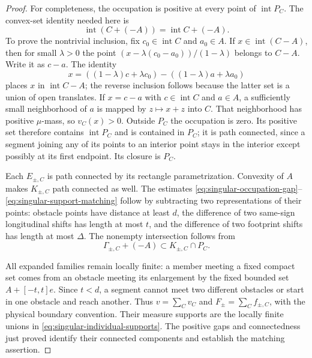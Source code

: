 \begin{proof}
For completeness, the occupation is positive at every point of
$\operatorname{int}P_C$.  The convex-set identity needed here is
\begin{equation}\label{eq:singular-interior-sum}
             \operatorname{int}(C+(-A))
                         =\operatorname{int}C+(-A).
\end{equation}
To prove the nontrivial inclusion, fix $c_0\in\operatorname{int}C$
and $a_0\in A$.  If $x\in\operatorname{int}(C-A)$, then for
small $\lambda>0$ the point
$(x-\lambda(c_0-a_0))/(1-\lambda)$ belongs to $C-A$.
Write it as $c-a$.  The identity
\[
 x=((1-\lambda)c+\lambda c_0)
                  -((1-\lambda)a+\lambda a_0)
\]
places $x$ in $\operatorname{int}C-A$; the reverse inclusion
follows because the latter set is a union of open translates.
If $x=c-a$ with $c\in\operatorname{int}C$ and $a\in A$, a
sufficiently small neighborhood of $a$ is mapped by $z\mapsto x+z$
into $C$.  That neighborhood has positive $\mu$-mass, so
$v_C(x)>0$.  Outside $P_C$ the occupation is zero.  Its positive
set therefore contains $\operatorname{int}P_C$ and is contained
in $P_C$; it is path connected, since a segment joining any of
its points to an interior point stays in the interior except
possibly at its first endpoint.  Its closure is $P_C$.

Each $E_{\pm,C}$ is path connected by its rectangle
parametrization.  Convexity of $A$ makes $K_{\pm,C}$ path
connected as well.  The estimates
\eqref{eq:singular-occupation-gap}--\eqref{eq:singular-support-matching}
follow by subtracting two representations of their points:
obstacle points have distance at least $d$, the difference of
two same-sign longitudinal shifts has length at most $t$, and
the difference of two footprint shifts has length at most
$\Delta$.  The nonempty intersection follows from
\[
 \Gamma_{\pm,C}+(-A)\subset K_{\pm,C}\cap P_C.
\]

All expanded families remain locally finite: a member meeting a
fixed compact set comes from an obstacle meeting its enlargement
by the fixed bounded set $A+[-t,t]e$.  Since $t<d$, a segment
cannot meet two different obstacles or start in one obstacle and
reach another.  Thus $v=\sum_Cv_C$ and
$F_\pm=\sum_C f_{\pm,C}$, with the physical boundary convention.
Their measure supports are the locally finite unions in
\eqref{eq:singular-individual-supports}.  The positive gaps and
connectedness just proved identify their connected components
and establish the matching assertion.
\end{proof}

